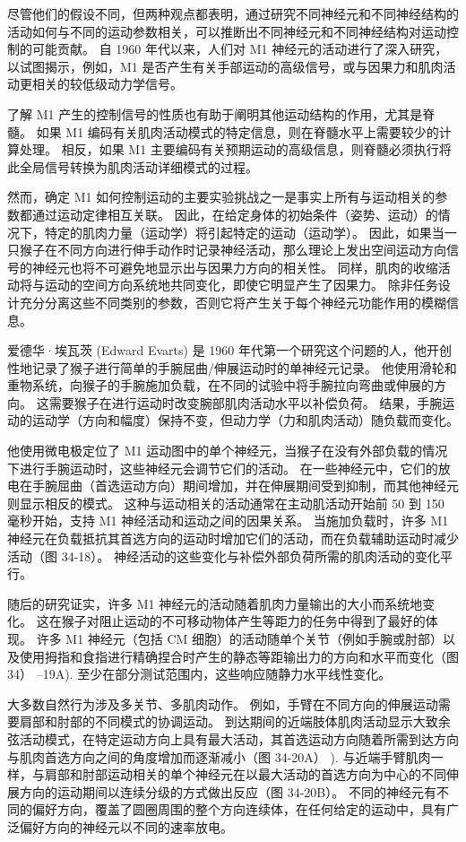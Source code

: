 尽管他们的假设不同，但两种观点都表明，通过研究不同神经元和不同神经结构的活动如何与不同的运动参数相关，可以推断出不同神经元和不同神经结构对运动控制的可能贡献。 自 1960 年代以来，人们对 M1 神经元的活动进行了深入研究，以试图揭示，例如，M1 是否产生有关手部运动的高级信号，或与因果力和肌肉活动更相关的较低级动力学信号。

了解 M1 产生的控制信号的性质也有助于阐明其他运动结构的作用，尤其是脊髓。 如果 M1 编码有关肌肉活动模式的特定信息，则在脊髓水平上需要较少的计算处理。 相反，如果 M1 主要编码有关预期运动的高级信息，则脊髓必须执行将此全局信号转换为肌肉活动详细模式的过程。

然而，确定 M1 如何控制运动的主要实验挑战之一是事实上所有与运动相关的参数都通过运动定律相互关联。 因此，在给定身体的初始条件（姿势、运动）的情况下，特定的肌肉力量（运动学）将引起特定的运动（运动学）。 因此，如果当一只猴子在不同方向进行伸手动作时记录神经活动，那么理论上发出空间运动方向信号的神经元也将不可避免地显示出与因果力方向的相关性。 同样，肌肉的收缩活动将与运动的空间方向系统地共同变化，即使它明显产生了因果力。 除非任务设计充分分离这些不同类别的参数，否则它将产生关于每个神经元功能作用的模糊信息。

爱德华·埃瓦茨 (Edward Evarts) 是 1960 年代第一个研究这个问题的人，他开创性地记录了猴子进行简单的手腕屈曲/伸展运动时的单神经元记录。 他使用滑轮和重物系统，向猴子的手腕施加负载，在不同的试验中将手腕拉向弯曲或伸展的方向。 这需要猴子在进行运动时改变腕部肌肉活动水平以补偿负荷。 结果，手腕运动的运动学（方向和幅度）保持不变，但动力学（力和肌肉活动）随负载而变化。

他使用微电极定位了 M1 运动图中的单个神经元，当猴子在没有外部负载的情况下进行手腕运动时，这些神经元会调节它们的活动。 在一些神经元中，它们的放电在手腕屈曲（首选运动方向）期间增加，并在伸展期间受到抑制，而其他神经元则显示相反的模式。 这种与运动相关的活动通常在主动肌活动开始前 50 到 150 毫秒开始，支持 M1 神经活动和运动之间的因果关系。 当施加负载时，许多 M1 神经元在负载抵抗其首选方向的运动时增加它们的活动，而在负载辅助运动时减少活动（图 34-18）。 神经活动的这些变化与补偿外部负荷所需的肌肉活动的变化平行。

随后的研究证实，许多 M1 神经元的活动随着肌肉力量输出的大小而系统地变化。 这在猴子对阻止运动的不可移动物体产生等距力的任务中得到了最好的体现。 许多 M1 神经元（包括 CM 细胞）的活动随单个关节（例如手腕或肘部）以及使用拇指和食指进行精确捏合时产生的静态等距输出力的方向和水平而变化（图 34） –19A). 至少在部分测试范围内，这些响应随静力水平线性变化。

大多数自然行为涉及多关节、多肌肉动作。 例如，手臂在不同方向的伸展运动需要肩部和肘部的不同模式的协调运动。 到达期间的近端肢体肌肉活动显示大致余弦活动模式，在特定运动方向上具有最大活动，其首选运动方向随着所需到达方向与肌肉首选方向之间的角度增加而逐渐减小（图 34-20A） ). 与近端手臂肌肉一样，与肩部和肘部运动相关的单个神经元在以最大活动的首选方向为中心的不同伸展方向的运动期间以连续分级的方式做出反应（图 34-20B）。 不同的神经元有不同的偏好方向，覆盖了圆圈周围的整个方向连续体，在任何给定的运动中，具有广泛偏好方向的神经元以不同的速率放电。

